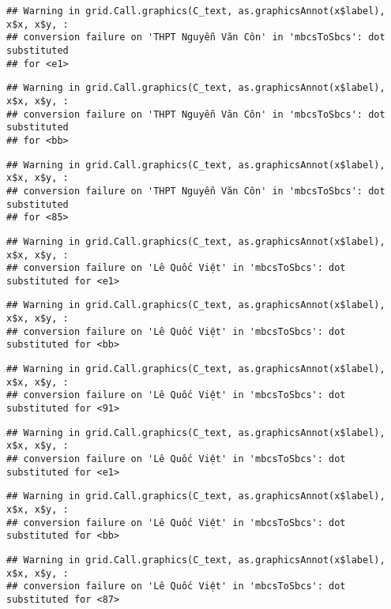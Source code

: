 \documentclass[
]{article}
\begin{document}
\begin{verbatim}
## Warning in grid.Call.graphics(C_text, as.graphicsAnnot(x$label), x$x, x$y, :
## conversion failure on 'THPT Nguyễn Văn Côn' in 'mbcsToSbcs': dot substituted
## for <e1>
\end{verbatim}

\begin{verbatim}
## Warning in grid.Call.graphics(C_text, as.graphicsAnnot(x$label), x$x, x$y, :
## conversion failure on 'THPT Nguyễn Văn Côn' in 'mbcsToSbcs': dot substituted
## for <bb>
\end{verbatim}

\begin{verbatim}
## Warning in grid.Call.graphics(C_text, as.graphicsAnnot(x$label), x$x, x$y, :
## conversion failure on 'THPT Nguyễn Văn Côn' in 'mbcsToSbcs': dot substituted
## for <85>
\end{verbatim}

\begin{verbatim}
## Warning in grid.Call.graphics(C_text, as.graphicsAnnot(x$label), x$x, x$y, :
## conversion failure on 'Lê Quốc Việt' in 'mbcsToSbcs': dot substituted for <e1>
\end{verbatim}

\begin{verbatim}
## Warning in grid.Call.graphics(C_text, as.graphicsAnnot(x$label), x$x, x$y, :
## conversion failure on 'Lê Quốc Việt' in 'mbcsToSbcs': dot substituted for <bb>
\end{verbatim}

\begin{verbatim}
## Warning in grid.Call.graphics(C_text, as.graphicsAnnot(x$label), x$x, x$y, :
## conversion failure on 'Lê Quốc Việt' in 'mbcsToSbcs': dot substituted for <91>
\end{verbatim}

\begin{verbatim}
## Warning in grid.Call.graphics(C_text, as.graphicsAnnot(x$label), x$x, x$y, :
## conversion failure on 'Lê Quốc Việt' in 'mbcsToSbcs': dot substituted for <e1>
\end{verbatim}

\begin{verbatim}
## Warning in grid.Call.graphics(C_text, as.graphicsAnnot(x$label), x$x, x$y, :
## conversion failure on 'Lê Quốc Việt' in 'mbcsToSbcs': dot substituted for <bb>
\end{verbatim}

\begin{verbatim}
## Warning in grid.Call.graphics(C_text, as.graphicsAnnot(x$label), x$x, x$y, :
## conversion failure on 'Lê Quốc Việt' in 'mbcsToSbcs': dot substituted for <87>
\end{verbatim}
\end{document}

